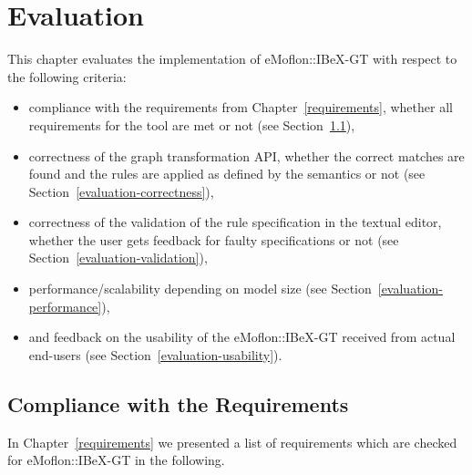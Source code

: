 
\chapter{Evaluation}
\label{evaluation}
This chapter evaluates the implementation of eMoflon::IBeX-GT with respect to the following criteria:
\begin{itemize}
	\item compliance with the requirements from Chapter~\ref{requirements}, \ie whether all requirements for the tool are met or not (see Section~\ref{evaluation-requirements}),
	\item correctness of the graph transformation API, \ie whether the correct matches are found and the rules are applied as defined by the semantics or not (see Section~\ref{evaluation-correctness}),
	\item correctness of the validation of the rule specification in the textual editor, \ie whether the user gets feedback for faulty specifications or not (see Section~\ref{evaluation-validation}),
	\item performance/scalability depending on model size (see Section~\ref{evaluation-performance}),
	\item and feedback on the usability of the eMoflon::IBeX-GT received from actual end-users (see Section~\ref{evaluation-usability}).
\end{itemize}


\section{Compliance with the Requirements}
\label{evaluation-requirements}
In Chapter~\ref{requirements} we presented a list of requirements which are checked for eMoflon::IBeX-GT in the following.

